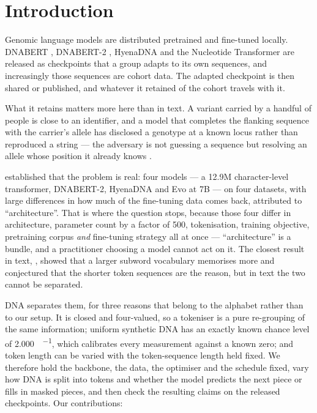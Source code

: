 \section{Introduction}
\label{sec:intro}

Genomic language models are distributed pretrained and fine-tuned locally. DNABERT
\cite{ji2021dnabert}, DNABERT-2 \cite{zhou2024dnabert2}, HyenaDNA \cite{nguyen2023hyenadna} and the
Nucleotide Transformer \cite{dalla2024nucleotide} are released as checkpoints that a group adapts to
its own sequences, and increasingly those sequences are cohort data. The adapted checkpoint is then
shared or published, and whatever it retained of the cohort travels with it.

What it retains matters more here than in text. A variant carried by a handful of people is close to
an identifier, and a model that completes the flanking sequence with the carrier's allele has
disclosed a genotype at a known locus rather than reproduced a string --- the adversary is not
guessing a sequence but resolving an allele whose position it already knows
\cite{li2013membership,tramer2015bounded}.

\cite{nemecek2026quantifying} established that the problem is real: four models --- a 12.9M
character-level transformer, DNABERT-2, HyenaDNA and Evo at 7B --- on four datasets, with large
differences in how much of the fine-tuning data comes back, attributed to ``architecture''. That is
where the question stops, because those four differ in architecture, parameter count by a factor of
\num{500}, tokenisation, training objective, pretraining corpus \emph{and} fine-tuning strategy all
at once --- ``architecture'' is a bundle, and a practitioner choosing a model cannot act on it. The closest result in text,
\cite{kharitonov2021bpe}, showed that a larger subword vocabulary memorises more and conjectured
that the shorter token sequences are the reason, but in text the two cannot be separated.

DNA separates them, for three reasons that belong to the alphabet rather than to our setup. It is
closed and four-valued, so a tokeniser is a pure re-grouping of the same information; uniform
synthetic DNA has an exactly known chance level of \SI{2.000}{\bit\per\nucleotide}, which calibrates
every measurement against a known zero; and token length can be varied with the token-sequence
length held fixed. We therefore hold the backbone, the data, the optimiser and the schedule fixed,
vary how DNA is split into tokens and whether the model predicts the next piece or fills in masked
pieces, and then check the resulting claims on the released checkpoints. Our contributions:

